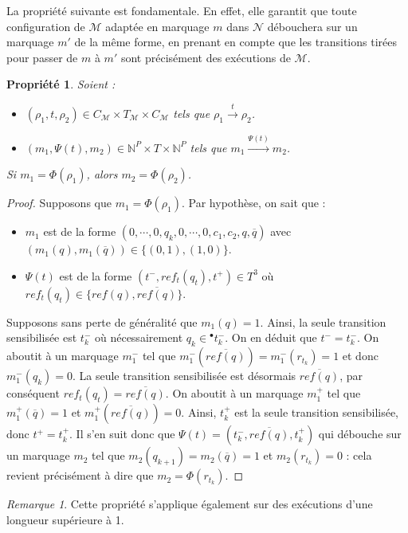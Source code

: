 \documentclass{article}
\newtheorem{property}{Propriété}
\theoremstyle{remark}
\newtheorem*{remark}{Remarque}
\theoremstyle{remark}
\newcommand{\preb}[1]{{}^\bullet #1}
\newcommand{\reaches}[1][]{\xrightarrow{#1}}
\begin{document}
La propriété suivante est fondamentale. En effet, elle garantit que toute configuration de $\mathcal{M}$ adaptée en marquage $m$ dans $\mathcal{N}$ débouchera sur un marquage $m'$ de la même forme, en prenant en compte que les transitions tirées pour passer de $m$ à $m'$ sont précisément des exécutions de $\mathcal{M}$.

\begin{property}
    \label{property:minsky-preservation}
    Soient : \begin{itemize}
        \item $(\rho_1, t, \rho_2) \in C_{\mathcal{M}} \times T_{\mathcal{M}} \times C_{\mathcal{M}}$ tels que $\rho_1 \reaches[t] \rho_2$.
        \item $(m_1, \Psi(t), m_2) \in \mathbb{N}^P \times T \times \mathbb{N}^P$ tels que $m_1 \reaches[\Psi(t)] m_2$.
    \end{itemize}
    Si $m_1 = \Phi(\rho_1)$, alors $m_2 = \Phi(\rho_2)$.
\end{property}

\begin{proof}
    Supposons que $m_1 = \Phi(\rho_1)$. Par hypothèse, on sait que : \begin{itemize}
        \item $m_1$ est de la forme $(0, \cdots, 0, q_k, 0, \cdots, 0, c_1, c_2, q, \overline{q})$ avec $(m_1(q), m_1(\overline{q})) \in \{(0, 1), (1, 0)\}$.
        \item $\Psi(t)$ est de la forme $(t^-, ref_t(q_t), t^+) \in T^3$ où $ref_t(q_t) \in \{ref(q), \overline{ref(q)}\}$.
    \end{itemize}
    Supposons sans perte de généralité que $m_1(q) = 1$. Ainsi, la seule transition sensibilisée est $t_k^-$ où nécessairement $q_k \in \preb{t_k^-}$. On en déduit que $t^- = t_k^-$. On aboutit à un marquage $m_1^-$ tel que $m_1^-(\overline{ref(q)}) = m_1^-(r_{t_k}) = 1$ et donc $m_1^-(q_k) = 0$. La seule transition sensibilisée est désormais $\overline{ref(q)}$, par conséquent $ref_t(q_t) = \overline{ref(q)}$. On aboutit à un marquage $m_1^+$ tel que $m_1^+(\overline{q}) = 1$ et $m_1^+(\overline{ref(q)}) = 0$. Ainsi, $t_k^+$ est la seule transition sensibilisée, donc $t^+ = t_k^+$. Il s'en suit donc que $\Psi(t) = (t_k^-, \overline{ref(q)}, t_k^+)$ qui débouche sur un marquage $m_2$ tel que $m_2(q_{k+1}) = m_2(\overline{q}) = 1$ et $m_2(r_{t_k}) = 0$ : cela revient précisément à dire que $m_2 = \Phi(r_{t_k})$.
\end{proof}

\begin{remark}
    Cette propriété s'applique également sur des exécutions d'une longueur supérieure à 1.
\end{remark}
\end{document}
